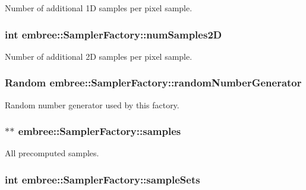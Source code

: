 Number of additional 1D samples per pixel sample. 

\hypertarget{classembree_1_1_sampler_factory_a2c6bbf4c15325b26b149dff750845759}{
\subsubsection[{numSamples2D}]{\setlength{\rightskip}{0pt plus 5cm}int {\bf embree::SamplerFactory::numSamples2D}}}
\label{classembree_1_1_sampler_factory_a2c6bbf4c15325b26b149dff750845759}


Number of additional 2D samples per pixel sample. 

\hypertarget{classembree_1_1_sampler_factory_ade987097a728763b39b5234f7f45799b}{
\subsubsection[{randomNumberGenerator}]{\setlength{\rightskip}{0pt plus 5cm}Random {\bf embree::SamplerFactory::randomNumberGenerator}}}
\label{classembree_1_1_sampler_factory_ade987097a728763b39b5234f7f45799b}


Random number generator used by this factory. 

\hypertarget{classembree_1_1_sampler_factory_ab19a6e8dfcb6a246a329997f71b0e372}{
\subsubsection[{samples}]{$\ast$$\ast$ {\bf embree::SamplerFactory::samples}}}
\label{classembree_1_1_sampler_factory_ab19a6e8dfcb6a246a329997f71b0e372}


All precomputed samples. 

\hypertarget{classembree_1_1_sampler_factory_adb750ed990fe1b5668c93d1d7ce65e73}{
\subsubsection[{sampleSets}]{\setlength{\rightskip}{0pt plus 5cm}int {\bf embree::SamplerFactory::sampleSets}}}
\label{classembree_1_1_sampler_factory_adb750ed990fe1b5668c93d1d7ce65e73}


